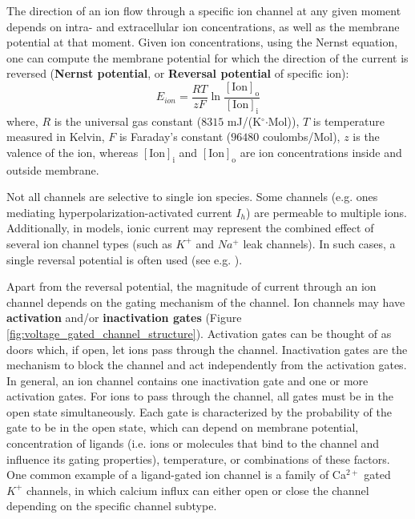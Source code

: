 \documentclass[../main.tex]{subfiles}
\begin{document}
The direction of an ion flow through a specific ion channel at any given moment depends on intra- and extracellular ion concentrations, as well as the membrane potential at that moment. Given ion concentrations, using the Nernst equation, one can compute the membrane potential for which the direction of the current is reversed \parencite{izhikevichDynamicalSystemsNeuroscience2006} (\textbf{Nernst potential}, or \textbf{Reversal potential} of specific ion):
\begin{equation}\label{eq:nernst_equation}
    E_{ion} = \frac{RT}{zF} \ln \frac{[\text{Ion}]_{\text{o}}}{[\text{Ion}]_{\text{i}}}
\end{equation}
where, $R$ is the universal gas constant ($8315$ mJ/(K$^\circ$$\cdot$Mol)), $T$ is temperature measured in Kelvin, $F$ is Faraday's constant ($96480$ coulombs/Mol), $z$ is the valence of the ion, whereas $[\text{Ion}]_{\text{i}}$ and $[\text{Ion}]_{\text{o}}$ are ion concentrations inside and outside membrane.

Not all channels are selective to single ion species. Some channels (e.g. ones mediating hyperpolarization-activated current $I_h$) are permeable to multiple ions. Additionally, in models, ionic current may represent the combined effect of several ion channel types (such as $K^+$ and $Na^+$ leak channels). In such cases, a single reversal potential is often used (see e.g. \parencite{wangMultipleDynamicalModes1994}).

Apart from the reversal potential, the magnitude of current through an ion channel depends on the gating mechanism of the channel. Ion channels may have \textbf{activation} and/or \textbf{inactivation gates} (Figure \ref{fig:voltage_gated_channel_structure}). Activation gates can be thought of as doors which, if open, let ions pass through the channel. Inactivation gates are the mechanism to block the channel and act independently from the activation gates. In general, an ion channel contains one inactivation gate and one or more activation gates. For ions to pass through the channel, all gates must be in the open state simultaneously. Each gate is characterized by the probability of the gate to be in the open state, which can depend on membrane potential, concentration of ligands (i.e. ions or molecules that bind to the channel and influence its gating properties), temperature, or combinations of these factors. One common example of a ligand-gated ion channel is a family of Ca$^{2+}$ gated $K^+$ channels, in which calcium influx can either open or close the channel depending on the specific channel subtype.
\end{document}
